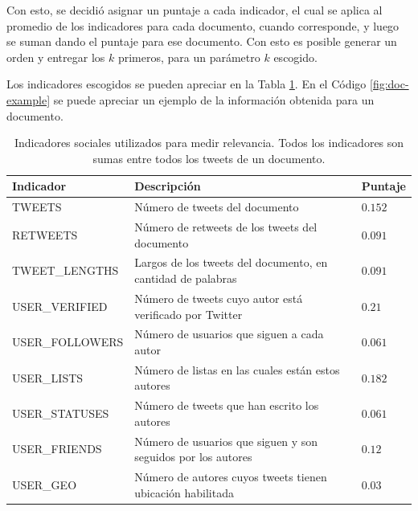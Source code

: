 \documentclass[upright, contnum]{umemoria}
\begin{document}
    Con esto, se decidió asignar un puntaje a cada indicador, el cual se aplica
    al promedio de los indicadores para cada documento, cuando
    corresponde, y luego se suman dando el puntaje para ese
    documento. Con esto es posible generar un orden y entregar los $k$
    primeros, para un parámetro $k$ escogido.

    Los indicadores escogidos se pueden apreciar en la Tabla
    \ref{tbl:indicadores}. En el Código \ref{fig:doc-example} se puede
    apreciar un ejemplo de la información obtenida para un documento.




\begin{table}[htb]
\begin{center}
\begin{tabular}{|l|l|l|}
\hline
 Indicador        &  Descripción                                                   &  Puntaje  \\
\hline
\hline
 TWEETS           &  Número de tweets del documento                                &  $0.152$  \\
 RETWEETS         &  Número de retweets de los tweets del documento                &  $0.091$  \\
 TWEET\_LENGTHS   &  Largos de los tweets del documento, en cantidad de palabras   &  $0.091$  \\
 USER\_VERIFIED   &  Número de tweets cuyo autor está verificado por Twitter       &  $0.21$   \\
 USER\_FOLLOWERS  &  Número de usuarios que siguen a cada autor                    &  $0.061$  \\
 USER\_LISTS      &  Número de listas en las cuales están estos autores            &  $0.182$  \\
 USER\_STATUSES   &  Número de tweets que han escrito los autores                  &  $0.061$  \\
 USER\_FRIENDS    &  Número de usuarios que siguen y son seguidos por los autores  &  $0.12$   \\
 USER\_GEO        &  Número de autores cuyos tweets tienen ubicación habilitada    &  $0.03$   \\
\hline
\end{tabular}
\end{center}
\caption{\label{tbl:indicadores}Indicadores sociales utilizados para medir relevancia. Todos los indicadores son sumas entre todos los tweets de un documento.}
\end{table}
\end{document}
